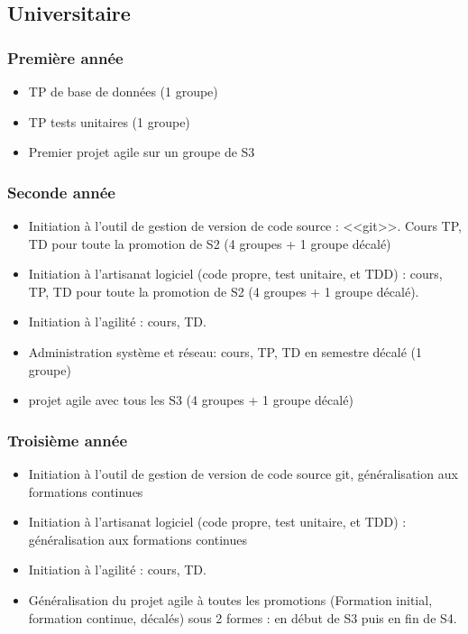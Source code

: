 \documentclass[a4paper]{article}
\begin{document}
\subsection{Universitaire}

\subsubsection{Première année}
\begin{itemize}
  \item TP de base de données (1 groupe)
  \item TP tests unitaires (1 groupe)
  \item Premier projet agile sur un groupe de S3
\end{itemize}

\subsubsection{Seconde année}
\begin{itemize}
  \item Initiation à l'outil de gestion de version de code source : <<git>>. Cours TP, TD pour toute la promotion de S2 (4 groupes + 1 groupe décalé)
  \item Initiation à l'artisanat logiciel (code propre, test unitaire, et TDD) : cours, TP, TD pour toute la promotion de S2 (4 groupes + 1 groupe décalé).
  \item Initiation à l'agilité : cours, TD.
  \item Administration système et réseau: cours, TP, TD en semestre décalé (1 groupe)
  \item projet agile avec tous les S3 (4 groupes + 1 groupe décalé)
\end{itemize}

\subsubsection{Troisième année}
\begin{itemize}
  \item Initiation à l'outil de gestion de version de code source git, généralisation aux formations continues
  \item Initiation à l'artisanat logiciel (code propre, test unitaire, et TDD) : généralisation aux formations continues
  \item Initiation à l'agilité : cours, TD.
  \item Généralisation du projet agile à toutes les promotions (Formation initial, formation continue, décalés) sous 2 formes : en début de S3 puis en fin de S4.
\end{itemize}
\end{document}
